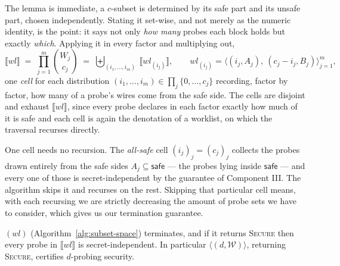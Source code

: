   The lemma is immediate, a $c$-subset is determined by its safe part and its
  unsafe part, chosen independently. Stating it set-wise, and not merely as the
  numeric identity, is the point: it says not only \emph{how many} probes each
  block holds but exactly \emph{which}. Applying it in every factor and
  multiplying out,
  \[
    \llbracket wl \rrbracket \;=\; \prod_{j=1}^{m} \binom{W_j}{c_j}
    \;=\; \biguplus_{(i_1, \dots, i_m)} \ \llbracket wl_{(i_j)} \rrbracket,
    \qquad
    wl_{(i_j)} = \big\langle (i_j, A_j),\ (c_j - i_j, B_j) \big\rangle_{j=1}^{m},
  \]
  one \emph{cell} for each distribution $(i_1, \dots, i_m) \in \prod_j \{0, \dots, c_j\}$
  recording, factor by factor, how many of a probe's wires come from the safe
  side. The cells are disjoint and exhaust $\llbracket wl \rrbracket$, since every
  probe declares in each factor exactly how much of it is safe and each cell
  is again the denotation of a worklist, on which the traversal recurses directly.

  One cell needs no recursion. The \emph{all-safe} cell $(i_j)_j = (c_j)_j$
  collects the probes drawn entirely from the safe sides $A_j \subseteq
  \mathsf{safe}$ --- the probes lying inside $\mathsf{safe}$ --- and every one of
  those is secret-independent by the guarantee of Component III. The algorithm
  skips it and recurses on the rest. Skipping that particular cell means, with each
  recursing we are strictly decreasing the amount of probe sets we have to consider,
  which gives us our termination guarantee.

  \begin{theorem}
  \label{thm:traversal}
  \textup{}$(wl)$ (Algorithm~\ref{alg:subset-space})
  terminates, and if it returns \textup{\textsc{Secure}} then every probe in
  $\llbracket wl \rrbracket$ is secret-independent. In particular
  \textup{}$\big\langle (d, \mathcal{W}) \big\rangle$, returning
  \textup{\textsc{Secure}}, certifies $d$-probing security.
  \end{theorem}

